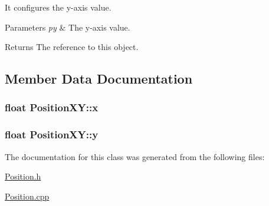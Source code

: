 It configures the y-\/axis value. 


\begin{DoxyParams}{Parameters}
{\em py} & The y-\/axis value. \\
\hline
\end{DoxyParams}
\begin{DoxyReturn}{Returns}
The reference to this object. 
\end{DoxyReturn}


\subsection{Member Data Documentation}
\hypertarget{class_position_x_y_a99d0a24e481bb0615157a08c1360dcec}{
\subsubsection[{x}]{\setlength{\rightskip}{0pt plus 5cm}float Position\+X\+Y\+::x\hspace{0.3cm}{\ttfamily [private]}}}\label{class_position_x_y_a99d0a24e481bb0615157a08c1360dcec}
\hypertarget{class_position_x_y_a16068e19060b1b47cee29398f2b26249}{
\subsubsection[{y}]{\setlength{\rightskip}{0pt plus 5cm}float Position\+X\+Y\+::y\hspace{0.3cm}{\ttfamily [private]}}}\label{class_position_x_y_a16068e19060b1b47cee29398f2b26249}


The documentation for this class was generated from the following files\+:\begin{DoxyCompactItemize}
\item 
\hyperlink{_position_8h}{Position.\+h}\item 
\hyperlink{_position_8cpp}{Position.\+cpp}\end{DoxyCompactItemize}
